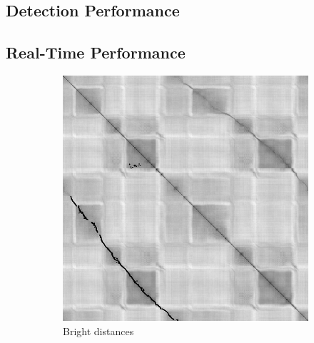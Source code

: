\documentclass[]{spie}  %
\begin{document}
\subsection{Detection Performance}

\subsection{Real-Time Performance}

\begin{figure}[!htb]
        \centering
        
        \begin{subfigure}[b]{0.27\textwidth}
        \centering
        \includegraphics[trim = 0mm 0mm 0mm 0mm, clip, width=\textwidth]{figures/dist_bright.png}    
        \caption{Bright distances}
        \label{subfig:dist_bright}
        \end{subfigure}
        ~ 
        \begin{subfigure}[b]{0.27\textwidth}
        \centering

\end{subfigure}
\end{figure}
\end{document}
